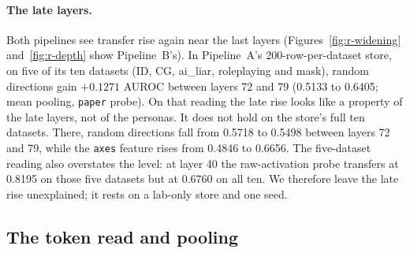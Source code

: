 \paragraph{The late layers.}
Both pipelines see transfer rise again near the last layers (Figures~\ref{fig:r-widening} and~\ref{fig:r-depth} show Pipeline~B's). %
In Pipeline~A's 200-row-per-dataset store, on five of its ten datasets (ID, CG, ai\_liar, roleplaying and mask), random directions gain $+0.1271$ AUROC between layers 72 and 79 (0.5133 to 0.6405; mean pooling, \texttt{paper} probe). %
On that reading the late rise looks like a property of the late layers, not of the personas. %
It does not hold on the store's full ten datasets. %
There, random directions fall from 0.5718 to 0.5498 between layers 72 and 79, while the \texttt{axes} feature rises from 0.4846 to 0.6656. %
The five-dataset reading also overstates the level: at layer 40 the raw-activation probe transfers at 0.8195 on those five datasets but at 0.6760 on all ten. %
We therefore leave the late rise unexplained; it rests on a lab-only store and one seed. %

\subsection{The token read and pooling}
\label{sec:r-token}

